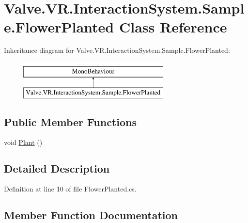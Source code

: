 \hypertarget{class_valve_1_1_v_r_1_1_interaction_system_1_1_sample_1_1_flower_planted}{}\section{Valve.\+V\+R.\+Interaction\+System.\+Sample.\+Flower\+Planted Class Reference}
\label{class_valve_1_1_v_r_1_1_interaction_system_1_1_sample_1_1_flower_planted}
Inheritance diagram for Valve.\+V\+R.\+Interaction\+System.\+Sample.\+Flower\+Planted\+:\begin{figure}[H]
\begin{center}
\leavevmode
\includegraphics[height=2.000000cm]{class_valve_1_1_v_r_1_1_interaction_system_1_1_sample_1_1_flower_planted}
\end{center}
\end{figure}
\subsection*{Public Member Functions}
\begin{DoxyCompactItemize}
\item 
void \mbox{\hyperlink{class_valve_1_1_v_r_1_1_interaction_system_1_1_sample_1_1_flower_planted_a79e0a5f2b2a65e52b129250e7d571bbb}{Plant}} ()
\end{DoxyCompactItemize}


\subsection{Detailed Description}


Definition at line 10 of file Flower\+Planted.\+cs.



\subsection{Member Function Documentation}
\mbox{\label{class_valve_1_1_v_r_1_1_interaction_system_1_1_sample_1_1_flower_planted_a79e0a5f2b2a65e52b129250e7d571bbb}} 
